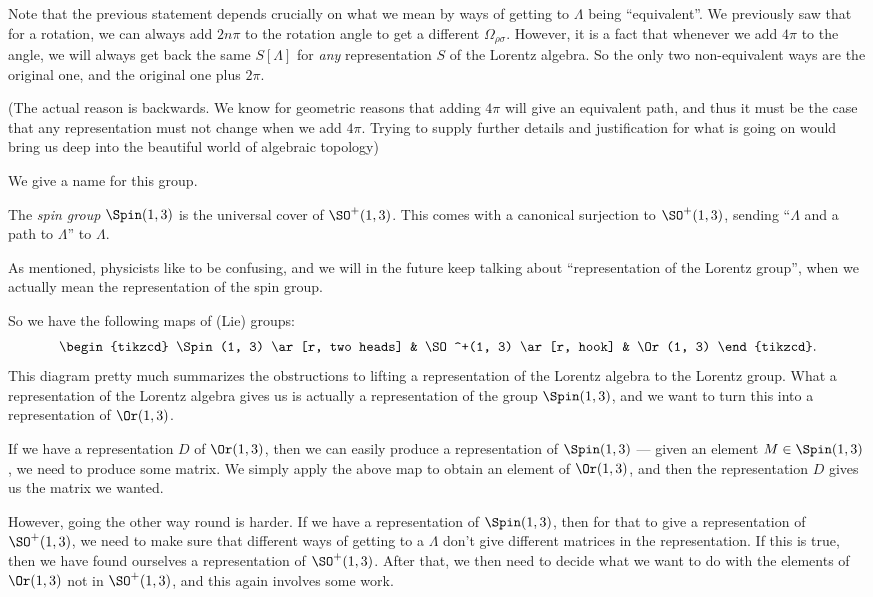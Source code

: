 \documentclass[a4paper]{article}
\begin{document}
Note that the previous statement depends crucially on what we mean by ways of getting to $\Lambda$ being ``equivalent''. We previously saw that for a rotation, we can always add $2n\pi$ to the rotation angle to get a different $\Omega_{\rho\sigma}$. However, it is a fact that whenever we add $4\pi$ to the angle, we will always get back the same $S[\Lambda]$ for \emph{any} representation $S$ of the Lorentz algebra. So the only two non-equivalent ways are the original one, and the original one plus $2\pi$.

(The actual reason is backwards. We know for geometric reasons that adding $4\pi$ will give an equivalent path, and thus it must be the case that any representation must not change when we add $4\pi$. Trying to supply further details and justification for what is going on would bring us deep into the beautiful world of algebraic topology)

We give a name for this group.
\begin{defi}
  The \emph{spin group} $\Spin(1, 3)$ is the universal cover of $\SO^+(1, 3)$. This comes with a canonical surjection to $\SO^+(1, 3)$, sending ``$\Lambda$ and a path to $\Lambda$'' to $\Lambda$.
\end{defi}
As mentioned, physicists like to be confusing, and we will in the future keep talking about ``representation of the Lorentz group'', when we actually mean the representation of the spin group.

So we have the following maps of (Lie) groups:
\[
  \begin{tikzcd}
    \Spin(1, 3) \ar[r, two heads] & \SO^+(1, 3) \ar[r, hook] & \Or(1, 3)
  \end{tikzcd}.
\]
This diagram pretty much summarizes the obstructions to lifting a representation of the Lorentz algebra to the Lorentz group. What a representation of the Lorentz algebra gives us is actually a representation of the group $\Spin(1, 3)$, and we want to turn this into a representation of $\Or(1, 3)$.

If we have a representation $D$ of $\Or(1, 3)$, then we can easily produce a representation of $\Spin(1, 3)$ --- given an element $M \in \Spin(1, 3)$, we need to produce some matrix. We simply apply the above map to obtain an element of $\Or(1, 3)$, and then the representation $D$ gives us the matrix we wanted.

However, going the other way round is harder. If we have a representation of $\Spin(1, 3)$, then for that to give a representation of $\SO^+(1, 3)$, we need to make sure that different ways of getting to a $\Lambda$ don't give different matrices in the representation. If this is true, then we have found ourselves a representation of $\SO^+(1, 3)$. After that, we then need to decide what we want to do with the elements of $\Or(1, 3)$ not in $\SO^+(1, 3)$, and this again involves some work.
\end{document}
